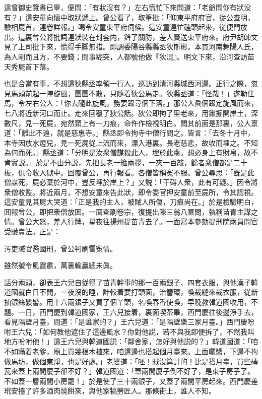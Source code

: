 這曾御史覽書已畢，便問：「有狀沒有？」左右慌忙下來問道：「老爺問你有狀没有？」這安童向懷中取狀遞上。曾公看了，取筆批：「仰東平府府官，従公查明，驗相屍首，連卷詳報。」喝令安童東平府伺候。這安童連忙磕頭起來，従便門放出。這裏曾公將批詞連狀裝在封套内，鈐了關防，差人賫送東平府來。府尹胡師文見了上司批下來，慌得手脚無措。即調委陽谷縣縣丞狄斯彬。本貫河南舞陽人氏，為人剛而且方，不要錢；問事糊突，人都號他做『狄混』。明文下來，沿河查訪苗天秀屍首下落。

也是合當有事，不想這狄縣丞率領一行人，巡訪到清河縣城西河邊。正行之際，忽見馬頭前起一陣旋風，團團不散，只隨着狄公馬走。狄縣丞道：「怪哉！」遂勒住馬，令左右公人：「你去隨此旋風，務要跟尋個下落。」那公人眞個跟定旋風而來，七八將近新河口而止。走來回覆了狄公話。狄公即拘了里老來，用鍬掘開岸土，深數尺，見一死屍，宛然頸上有一刀痕，命仵作檢視明白。問其前面是那裏，公人禀道：「離此不遠，就是慈惠寺。」縣丞即令拘寺中僧行問之。皆言：「去冬十月中，本寺因放水燈兒，見一死屍従上流而來，漂入港裏。長老慈悲，故收而埋之。不知為何而死。」縣丞道：「分明是汝衆僧謀殺此人，埋於此䖏。想必身上有財帛，故不肯實説。」於是不由分説，先把長老一箍兩拶，一夾一百敲，餘者衆僧都是二十板，俱令收入獄中。回覆曾公，再行報看。各僧皆稱寃不服。曾公尋思：「旣是此僧謀死，屍必棄於河中，豈反埋於岸上？」又説：「干碍人衆，此有可疑。」因令將衆僧收監。將近兩月，不想安童來告此狀，即令委官押安童前至屍所，令其認視。這安童見其屍大哭道：「正是我的主人，被賊人所傷，刀痕尚在。」於是檢驗明白，囬報曾公，即把衆僧放囬。一面查刷卷宗，復提出陳三翁八審問，執稱苗青主謀之情。曾公大怒，差人行牌，星夜往揚州提苗青去了。一面寫本參劾提刑院兩員問官受贜賣法。正是：

\begin{myquote}
汚吏贓官濫國刑，曾公判刷雪寃情。

雖然號令風霆肅，萬裏輸贏總未眞。
\end{myquote}

話分兩頭，卻表王六兒自従得了苗青幹事的那一百兩銀子、四套衣服，與他漢子韓道國就白日不閒，一夜沒的睡，計較着要打頭面，治簪環，喚裁縫來裁衣服，従新抽銀絲䯼髻。用十六兩銀子又買了個丫頭，名喚春香使喚，早晚教韓道國收用，不題。一日，西門慶到韓道國家，王六兒接着，裏面喫茶畢，西門慶往後邊淨手去，看見隔壁月臺，問道：「是誰家的？」王六兒道：「是隔壁樂三家月臺。」西門慶吩咐王六兒：「如何教他遮住了這邊風水？你對他説，若不與我即便拆了，不然我叫地方吩咐他！」這王六兒與韓道國説：「鄰舍家，怎好與他説的？」韓道國道：「咱不如瞞着老爹，廟上買幾根木植來，咱這邊也搭起個月臺來。上面曬醬，下邊不拘做馬坊，做個東淨，也是好處。」老婆道：「呸！賊沒算計的！比是搭月臺，買些磚瓦來蓋上兩間廈子卻不好？」韓道國道：「蓋兩間廈子倒不好了，是東子房子了。不如蓋一層兩間小房罷！」於是使了三十兩銀子，又蓋了兩間平房起來。西門慶差玳安擡了許多酒肉燒餅來，與他家犒勞匠人。那條街上，誰人不知。

